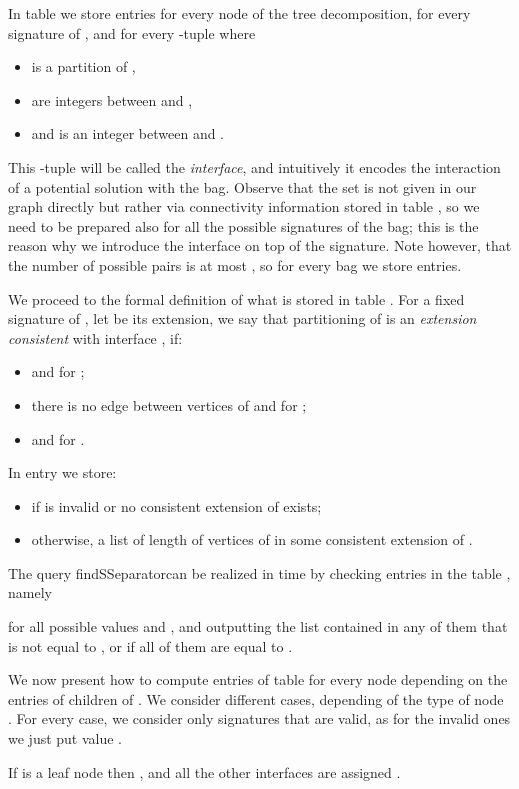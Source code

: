 \documentclass[a4paper,11pt]{article}
\theoremstyle{definition}
\theoremstyle{remark}
\newcommand{\qSsep}{\textnormal{findSSeparator}}
\begin{document}
In table  we store entries for every node  of the tree
decomposition, for every signature  of , and for
every -tuple  where
\begin{itemize}
\item  is a partition of ,
\item  are integers between  and ,
\item and  is an integer between  and .
\end{itemize}
This -tuple  will be called the {\emph{interface}}, and
intuitively it encodes the interaction of a potential solution with
the bag.  Observe that the set  is not given in our graph directly but
rather via connectivity information stored in table , so we need to
be prepared also for all the possible signatures of the bag; this is
the reason why we introduce the interface on top of the signature.
Note however, that the number of possible pairs  is at
most , so for every bag  we store
 entries.

We proceed to the formal definition of what is stored in table .
For a fixed signature  of , let
 be its extension, we say that partitioning
 of  is an {\emph{extension consistent}} with interface
, if:
\begin{itemize}
\item  and  for ;
\item there is no edge between vertices of  and
   for ;
\item  and  for .
\end{itemize}

In entry  we store:
\begin{itemize}
\item  if  is invalid or no consistent extension of  exists;
\item otherwise, a list of length  of vertices of 
  in some consistent extension of .
\end{itemize}

The query \qSsep can be realized in  time by checking entries
in the table , namely 

for all possible values  and , and
outputting the list contained in any of them that is not equal to
, or  if all of them are equal to .

We now present how to compute entries of table  for every node
 depending on the entries of children of .  We consider
different cases, depending of the type of node .  For every case,
we consider only signatures that are valid, as for the invalid ones we
just put value .  

\vskip 0.3cm
 If  is a leaf node then
,
and all the other interfaces are assigned .  \vskip 0.3cm
\end{document}
